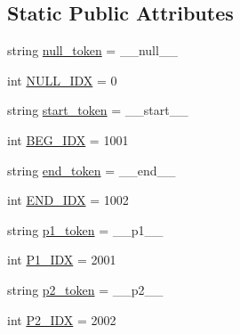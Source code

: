 \subsection*{Static Public Attributes}
\begin{DoxyCompactItemize}
\item 
string \hyperlink{classparlai_1_1agents_1_1test__agents_1_1dummy__torch__agent_1_1MockDict_a4b03100cbac5243127652e25e65e258f}{null\+\_\+token} = \textquotesingle{}\+\_\+\+\_\+null\+\_\+\+\_\+\textquotesingle{}
\item 
int \hyperlink{classparlai_1_1agents_1_1test__agents_1_1dummy__torch__agent_1_1MockDict_a3e0a04162ec99b4324a27efac7585e58}{N\+U\+L\+L\+\_\+\+I\+DX} = 0
\item 
string \hyperlink{classparlai_1_1agents_1_1test__agents_1_1dummy__torch__agent_1_1MockDict_ad9a8b7b6077637d2c7015e19600c22d9}{start\+\_\+token} = \textquotesingle{}\+\_\+\+\_\+start\+\_\+\+\_\+\textquotesingle{}
\item 
int \hyperlink{classparlai_1_1agents_1_1test__agents_1_1dummy__torch__agent_1_1MockDict_a72d0bd92900466e4cbcdf217c5b4f498}{B\+E\+G\+\_\+\+I\+DX} = 1001
\item 
string \hyperlink{classparlai_1_1agents_1_1test__agents_1_1dummy__torch__agent_1_1MockDict_a5eb93006715c76543cec9a682b35614a}{end\+\_\+token} = \textquotesingle{}\+\_\+\+\_\+end\+\_\+\+\_\+\textquotesingle{}
\item 
int \hyperlink{classparlai_1_1agents_1_1test__agents_1_1dummy__torch__agent_1_1MockDict_ae67922b8eddea3a8f5262f93a9b9be70}{E\+N\+D\+\_\+\+I\+DX} = 1002
\item 
string \hyperlink{classparlai_1_1agents_1_1test__agents_1_1dummy__torch__agent_1_1MockDict_afb29f9c4038098b397a1ca234afb59f0}{p1\+\_\+token} = \textquotesingle{}\+\_\+\+\_\+p1\+\_\+\+\_\+\textquotesingle{}
\item 
int \hyperlink{classparlai_1_1agents_1_1test__agents_1_1dummy__torch__agent_1_1MockDict_a30842b3b794cc768ef1daa5dde5b696c}{P1\+\_\+\+I\+DX} = 2001
\item 
string \hyperlink{classparlai_1_1agents_1_1test__agents_1_1dummy__torch__agent_1_1MockDict_acffe6a39ea4750f9413f376273ec9466}{p2\+\_\+token} = \textquotesingle{}\+\_\+\+\_\+p2\+\_\+\+\_\+\textquotesingle{}
\item 
int \hyperlink{classparlai_1_1agents_1_1test__agents_1_1dummy__torch__agent_1_1MockDict_a9336349edca8f47aad59314ea48e7eaa}{P2\+\_\+\+I\+DX} = 2002
\end{DoxyCompactItemize}


